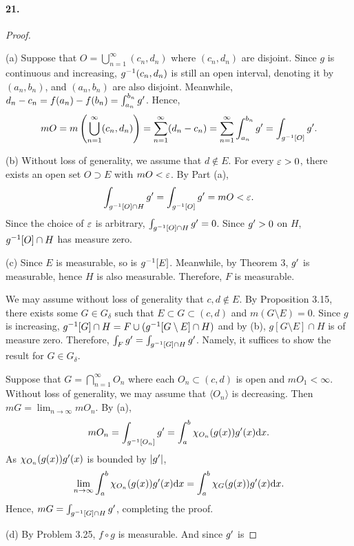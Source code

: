   \paragraph{21.}
  \begin{proof}
    $\,$\par
    (a) Suppose that $O=\bigcup_{n=1}^\infty(c_n,d_n)$ where $(c_n,d_n)$ are 
    disjoint. Since $g$ is continuous and increasing, $g^{-1}(c_n,d_n)$ is still
    an open interval, denoting it by $(a_n,b_n)$, and $(a_n,b_n)$ are also 
    disjoint. Meanwhile, $d_n-c_n=f(a_n)-f(b_n)=\int_{a_n}^{b_n}g^\prime $. Hence,
    \[
      mO = m\left(\bigcup_{n=1}^\infty(c_n,d_n)\right) = 
      \sum_{n=1}^\infty(d_n-c_n) = 
      \sum_{n=1}^\infty \int_{a_n}^{b_n}g^\prime = 
      \int_{g^{-1}[O]}g^\prime.
    \]\par
    (b) Without loss of generality, we assume that $d\notin E$. For every $\varepsilon
    >0$, there exists an open set $O\supset E$ with $mO<\varepsilon$. By Part (a),
    \[
      \int_{g^{-1}[O]\cap H}g^\prime = \int_{g^{-1}[O]}g^\prime = mO < \varepsilon.
    \]
    Since the choice of $\varepsilon$ is arbitrary, $\int_{g^{-1}[O]\cap H}g^\prime = 0$.
    Since $g^\prime > 0$ on $H$, $g^{-1}[O]\cap H$ has measure zero.\par
    (c) Since $E$ is measurable, so is $g^{-1}[E]$. Meanwhile, by Theorem 3, 
    $g^\prime$ is measurable, hence $H$ is also measurable. Therefore, $F$ is
    measurable.\par
    We may assume without loss of generality that $c,d\notin E$. By Proposition
    3.15, there exists some $G\in G_\delta$ such that $E\subset G\subset(c,d)$
    and $m(G\setminus E)=0$. Since $g$ is increasing, $g^{-1}[G]\cap H = F\cup
    (g^{-1}[G\setminus E]\cap H)$ and by (b), $g[G\setminus E]\cap H$ is of
    measure zero. Therefore, $\int_F g^\prime=\int_{g^{-1}[G]\cap H}g^\prime$. Namely, it 
    suffices to show the result for $G\in G_\delta$. \par
    Suppose that $G=\bigcap_{n=1}^\infty O_n$ where each $O_n\subset(c,d)$ is 
    open and $mO_1<\infty$. Without loss of generality, we may assume that 
    $\langle O_n\rangle$ is decreasing. Then $mG=\lim_{n\to\infty}mO_n$. By (a),
    \[
      mO_n = \int_{g^{-1}[O_n]}g^\prime = \int_a^b\chi_{O_n}(g(x))g^\prime(x)\mathrm{d} x.
    \]
    As $\chi_{O_n}(g(x))g^\prime(x)$ is bounded by $|g^\prime|$, 
    \[
      \lim_{n\to\infty}\int_a^b\chi_{O_n}(g(x))g^\prime(x)\mathrm{d} x =
      \int_a^b\chi_G(g(x))g^\prime(x)\mathrm{d} x.
    \]
    Hence, $mG=\int_{g^{-1}[G]\cap H}g^\prime$, completing the proof.\par
    (d) By Problem 3.25, $f\circ g$ is measurable. And since $g^\prime$ is 

\end{proof}
